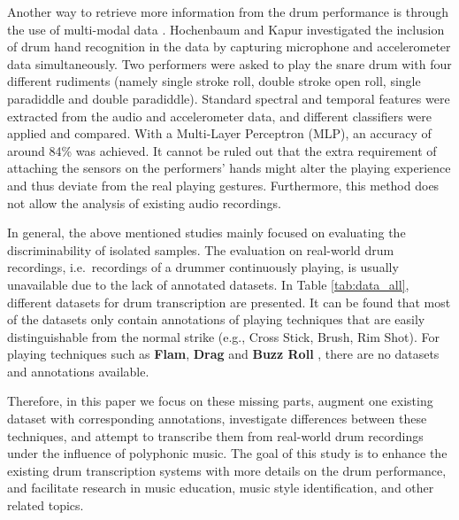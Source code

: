 \documentclass{article}
\begin{document}
Another way to retrieve more information from the drum performance is through the use of multi-modal data \cite{Hochenbaum2011}. Hochenbaum and Kapur investigated the inclusion of drum hand recognition in the data by capturing microphone and accelerometer data simultaneously. Two performers were asked to play the snare drum with four different rudiments (namely single stroke roll, double stroke open roll, single paradiddle and double paradiddle). Standard spectral and temporal features were extracted from the audio and accelerometer data, and different classifiers were applied and compared. With a Multi-Layer Perceptron (MLP), an accuracy of around 84\% was achieved. {\color{red}{again, more info on features and classes?}} It cannot be ruled out that the extra requirement of attaching the sensors on the performers' hands might alter the playing experience and thus deviate from the real playing gestures. Furthermore, this method does not allow the analysis of existing audio recordings. 

In general, the above mentioned studies mainly focused on evaluating the discriminability of isolated samples. The evaluation on real-world drum recordings, i.e.\ recordings of a drummer continuously playing, is usually unavailable due to the lack of annotated datasets. In Table \ref{tab:data_all}, different datasets for drum transcription are presented. It can be found that most of the datasets only contain annotations of playing techniques that are easily distinguishable from the normal strike (e.g., Cross Stick, Brush, Rim Shot). For playing techniques such as \textbf{Flam}, \textbf{Drag} and \textbf{Buzz Roll} {\color{red}{why bold? --- is this the introduction of your classes? Then do it more systematically in Method}}, there are no datasets and annotations available. 

{\color{red}{the following is not related work. Find a better place}} Therefore, in this paper we focus on these missing parts, augment one existing dataset with corresponding annotations, investigate differences between these techniques, and attempt to transcribe them from real-world drum recordings under the influence of polyphonic music. The goal of this study is to enhance the existing drum transcription systems with more details on the drum performance, and facilitate research in music education, music style identification, and other related topics. 
\end{document}
